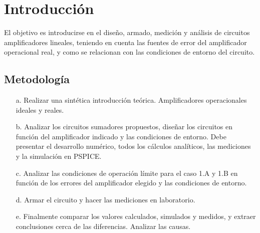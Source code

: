\documentclass[12pt]{article}
\begin{document}

\newpage

\tableofcontents
\newpage



\section{Introducción}
El objetivo es introducirse en el diseño, armado, medición y análisis de circuitos amplificadores lineales, teniendo en cuenta las fuentes de error del amplificador operacional real, y como se relacionan con las condiciones de entorno del circuito.

\subsection*{Metodología}

\begin{itemize}
\item[a.] Realizar una sintética introducción teórica. Amplificadores operacionales ideales y reales.
\item[b.] Analizar los circuitos sumadores propuestos, diseñar los circuitos en función del amplificador indicado y las condiciones de entorno. Debe presentar el desarrollo numérico, todos los cálculos analíticos, las mediciones y la simulación en PSPICE.
\item[c.] Analizar las condiciones de operación límite para el caso 1.A y 1.B en función de los errores del amplificador elegido y las condiciones de entorno.
\item[d.] Armar el circuito y hacer las mediciones en laboratorio.
\item[e.] Finalmente comparar los valores calculados, simulados y medidos, y extraer conclusiones cerca de las diferencias. Analizar las causas.
\end{itemize}




\newpage


\newpage


\newpage
 
\end{document}
